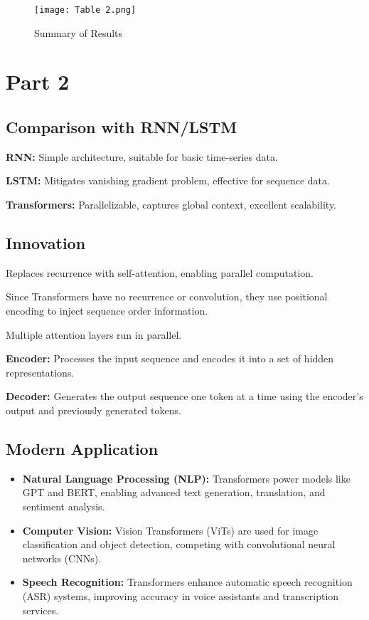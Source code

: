 \documentclass{article}
\begin{document}
\begin{figure}[ht]
    \centering
    \texttt{[image: Table 2.png]} 
    \caption{Summary of Results}
    \label{Table}
\end{figure}

\section{Part 2}

\subsection{Comparison with RNN/LSTM}
\textbf{RNN:} Simple architecture, suitable for basic time-series data.

\textbf{LSTM:} Mitigates vanishing gradient problem, effective for sequence data.

\textbf{Transformers:} Parallelizable, captures global context, excellent scalability.

\subsection{Innovation}
Replaces recurrence with self-attention, enabling parallel computation.

Since Transformers have no recurrence or convolution, they use positional encoding to inject sequence order information.

Multiple attention layers run in parallel.

\textbf{Encoder:} Processes the input sequence and encodes it into a set of hidden representations.

\textbf{Decoder:} Generates the output sequence one token at a time using the encoder’s output and previously generated tokens.

\subsection{Modern Application}
\begin{itemize}
    \item \textbf{Natural Language Processing (NLP):} Transformers power models like GPT and BERT, enabling advanced text generation, translation, and sentiment analysis.
    \item \textbf{Computer Vision:} Vision Transformers (ViTs) are used for image classification and object detection, competing with convolutional neural networks (CNNs).
    \item \textbf{Speech Recognition:} Transformers enhance automatic speech recognition (ASR) systems, improving accuracy in voice assistants and transcription services.
\end{itemize}
\end{document}
